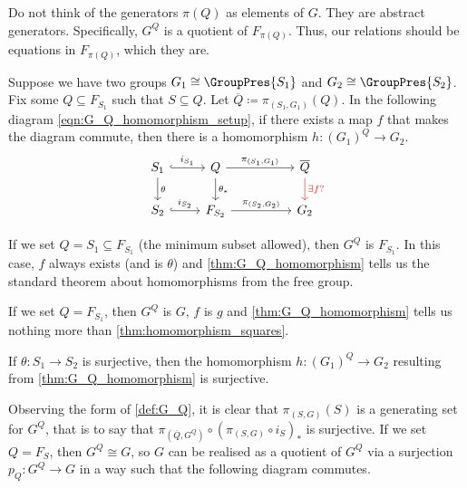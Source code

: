 Do not think of  the generators $\pi(Q)$ as elements of $G$.
They are abstract generators.
Specifically,  $G^Q$ is a quotient of  $F_{\pi(Q)}$.
Thus, our relations should be equations in $F_{\pi(Q)}$, which they are.

\begin{proposition}
	Suppose we have two groups $G_1 \cong \GroupPres{S_1}$ and $G_2 \cong \GroupPres{S_2}$.
	Fix some $Q \subseteq F_{S_1}$ such that  $S \subseteq Q$.
	Let $\overline{Q} \coloneqq \pi_{(S_1, G_1)}(Q) $.
	In the following diagram \eqref{eqn:G_Q_homomorphism_setup}, if there exists a map $f$ that makes the diagram commute, then there is a homomorphism $h \colon (G_1)^Q \to G_2$.
	\begin{equation}
		\begin{tikzcd}
			S_1 \ar[d, "\theta"] \ar[r, hook, "i_{S_1}"] & Q \ar[d, "\theta_*"] \ar[rr, "\pi_{(S_1,G_1)}"] & & \overline{Q} \ar[d, color=red, "\exists f ?"] \\
			S_2 \ar[r, hook, "i_{S_2}"] & F_{S_2} \ar[rr, "\pi_{(S_2,G_2)}"] & & G_2
		\end{tikzcd}
		\label{eqn:G_Q_homomorphism_setup}
	\end{equation}
	\label{thm:G_Q_homomorphism}
\end{proposition}

\begin{remark}
	If we set $Q = S_1 \subseteq F_{S_1}$ (the minimum subset allowed), then  $G^Q$ is  $F_{S_1}$.
	In this case, $f$ always exists (and is  $\theta$) and \cref{thm:G_Q_homomorphism} tells us the standard theorem about homomorphisms from the free group.
\end{remark}

\begin{remark}
	If we set $Q = F_{S_1}$, then $G^Q$ is  $G$, $f$ is $g$ and \cref{thm:G_Q_homomorphism} tells us nothing more than  \cref{thm:homomorphism_squares}.
\end{remark}

\begin{remark}
	If $\theta \colon S_1 \to S_2$ is surjective, then the homomorphism $h \colon (G_1)^Q \to G_2$ resulting from \cref{thm:G_Q_homomorphism} is surjective.
\end{remark}

Observing the form of \cref{def:G_Q}, it is clear that $\pi_{(S,G)}(S)$ is a generating set for $G^Q$, that is to say that $\pi_{(\overline{Q},G^Q)} \circ \left(\pi_{(S,G)} \circ i_S \right)_*$ is surjective.
If we set $Q=F_S$, then $G^Q \cong G$, so $G$ can be realised as a quotient of $G^Q$ via a surjection $p_Q \colon G^Q \to G$ in a way such that the following diagram commutes.


